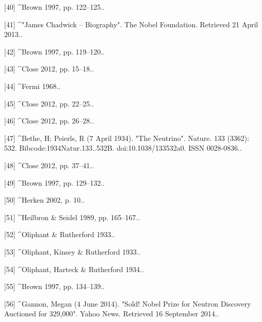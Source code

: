 [40]
^Brown 1997, pp. 122–125..

[41]
^"James Chadwick – Biography". The Nobel Foundation. Retrieved 21 April 2013..

[42]
^Brown 1997, pp. 119–120..

[43]
^Close 2012, pp. 15–18..

[44]
^Fermi 1968..

[45]
^Close 2012, pp. 22–25..

[46]
^Close 2012, pp. 26–28..

[47]
^Bethe, H; Peierls, R (7 April 1934). "The Neutrino". Nature. 133 (3362): 532. Bibcode:1934Natur.133..532B. doi:10.1038/133532a0. ISSN 0028-0836..

[48]
^Close 2012, pp. 37–41..

[49]
^Brown 1997, pp. 129–132..

[50]
^Herken 2002, p. 10..

[51]
^Heilbron & Seidel 1989, pp. 165–167..

[52]
^Oliphant & Rutherford 1933..

[53]
^Oliphant, Kinsey & Rutherford 1933..

[54]
^Oliphant, Harteck & Rutherford 1934..

[55]
^Brown 1997, pp. 134–139..

[56]
^Gannon, Megan (4 June 2014). "Sold! Nobel Prize for Neutron Discovery Auctioned for 329,000". Yahoo News. Retrieved 16 September 2014..

